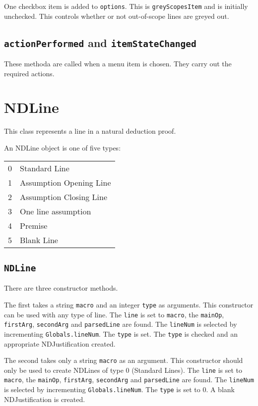 \documentclass[a4paper]{article}
\begin{document}
One checkbox item is added to \texttt{options}. This is \texttt{greyScopesItem} and is initially unchecked. This controls whether or not out-of-scope lines are greyed out.

\subsection{\texttt{actionPerformed} and \texttt{itemStateChanged}}
These methoda are called when a menu item is chosen. They carry out the required actions.


\section{NDLine}
This class represents a line in a natural deduction proof.

An NDLine object is one of five types:
\begin{center}
	\begin{tabular}{c l}
		0 & Standard Line\\
		1 & Assumption Opening Line \\
		2 & Assumption Closing Line \\
		3 & One line assumption \\
		4 & Premise \\
		5 & Blank Line\\
	\end{tabular}
\end{center}

\subsection{\texttt{NDLine}}
There are three constructor methods.

The first takes a string \texttt{macro} and an integer \texttt{type} as arguments. This constructor can be used with any type of line. The \texttt{line} is set to \texttt{macro}, the \texttt{mainOp}, \texttt{firstArg}, \texttt{secondArg} and \texttt{parsedLine} are found. The \texttt{lineNum} is selected by incrementing \texttt{Globals.lineNum}. The \texttt{type} is set. The \texttt{type} is checked and an appropriate NDJustification created. 

The second takes only a string \texttt{macro} as an argument. This constructor should only be used to create NDLines of type 0 (Standard Lines). The \texttt{line} is set to \texttt{macro}, the \texttt{mainOp}, \texttt{firstArg}, \texttt{secondArg} and \texttt{parsedLine} are found. The \texttt{lineNum} is selected by incrementing \texttt{Globals.lineNum}. The \texttt{type} is set to 0. A blank NDJustification is created.
\end{document}
